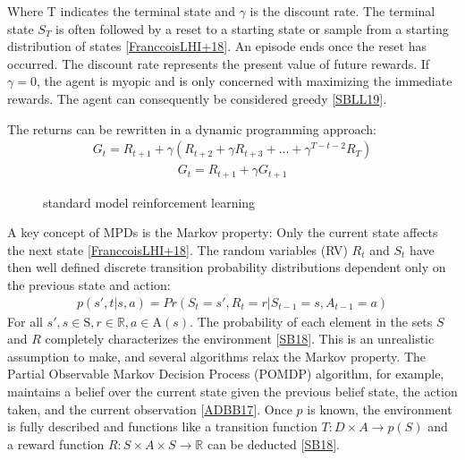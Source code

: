 \documentclass[letterpaper,10pt,english]{jupyterBook}
\let\sphinxpxdimen\pdfpxdimen\else\newdimen\sphinxpxdimen
\begin{document}
\sphinxAtStartPar
Where T indicates the terminal state and \(\gamma\) is the discount rate. The terminal state \(S_T\) is often followed by a reset to a starting state or sample from a starting distribution of states {[}\hyperlink{cite.Discussion:id59}{FranccoisLHI+18}{]}. An episode ends once the reset has occurred. The discount rate represents the present value of future rewards. If \(\gamma = 0\), the agent is myopic and is only concerned with maximizing the immediate rewards. The agent can consequently be considered greedy {[}\hyperlink{cite.Discussion:id42}{SBLL19}{]}.

\sphinxAtStartPar
The returns can be rewritten in a dynamic programming approach:
\begin{equation*}
\begin{split} G_t = R_{t+1} + \gamma(R_{t+2} + \gamma R_{t+3} + ... + \gamma^{T-t-2}R_T) \end{split}
\end{equation*}\begin{equation*}
\begin{split} G_t = R_{t+1} + \gamma G_{t+1}\end{split}
\end{equation*}
\begin{figure}[htbp]
\centering
\capstart

\noindent\sphinxincludegraphics[width=600\sphinxpxdimen,height=300\sphinxpxdimen]{{standard_model}.png}
\caption{standard model reinforcement learning}\label{\detokenize{Reinforcement_learning:standard-model-fig}}\end{figure}

\sphinxAtStartPar
A key concept of MPDs is the Markov property: Only the current state affects the next state {[}\hyperlink{cite.Discussion:id59}{FranccoisLHI+18}{]}. The random variables (RV) \(R_t\) and \(S_t\) have then well defined discrete transition probability distributions dependent only on the previous state and action:
\begin{equation*}
\begin{split} p(s', t| s, a) = Pr(S_t = s', R_t = r | S_{t-1} = s, A_{t-1}=a) \end{split}
\end{equation*}
\sphinxAtStartPar
For all \(s', s \in \mathrm{S} , r \in 	\mathbb{R}, a \in \mathrm{A}(s) \). The probability of each element in the sets \(S\) and \(R\) completely characterizes the environment {[}\hyperlink{cite.Discussion:id57}{SB18}{]}. This is an unrealistic assumption to make, and several algorithms relax the Markov property. The Partial Observable Markov Decision Process (POMDP) algorithm, for example, maintains a belief over the current state given the previous belief state, the action taken, and the current observation {[}\hyperlink{cite.Discussion:id50}{ADBB17}{]}.  Once \(p\) is known, the environment is fully described and functions like a transition function \(T : D \times A \to p(S)\) and a reward function \(R: S \times A \times S \to \mathbb{R}\) can be deducted {[}\hyperlink{cite.Discussion:id57}{SB18}{]}.
\end{document}
